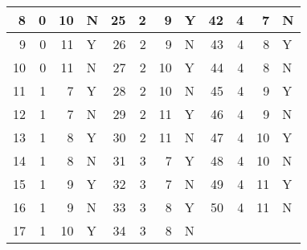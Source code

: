 \documentclass[12pt, letterpaper, titlepage]{article}
\begin{document}
\begin{table}[H]
\begin{tabular}{|r|r|r|l|r|r|r|l|r|r|r|l|}
    8                             & 0                      & 10                     & N & 25                           & 2                      & 9                      & Y & 42                           & 4                      & 7                      & N \\ \hline
    9                             & 0                      & 11                     & Y & 26                           & 2                      & 9                      & N & 43                           & 4                      & 8                      & Y \\ \hline
    10                            & 0                      & 11                     & N & 27                           & 2                      & 10                     & Y & 44                           & 4                      & 8                      & N \\ \hline
    11                            & 1                      & 7                      & Y & 28                           & 2                      & 10                     & N & 45                           & 4                      & 9                      & Y \\ \hline
    12                            & 1                      & 7                      & N & 29                           & 2                      & 11                     & Y & 46                           & 4                      & 9                      & N \\ \hline
    13                            & 1                      & 8                      & Y & 30                           & 2                      & 11                     & N & 47                           & 4                      & 10                     & Y \\ \hline
    14                            & 1                      & 8                      & N & 31                           & 3                      & 7                      & Y & 48                           & 4                      & 10                     & N \\ \hline
    15                            & 1                      & 9                      & Y & 32                           & 3                      & 7                      & N & 49                           & 4                      & 11                     & Y \\ \hline
    16                            & 1                      & 9                      & N & 33                           & 3                      & 8                      & Y & 50                           & 4                      & 11                     & N \\ \hline
    17                            & 1                      & 10                     & Y & 34                           & 3                      & 8                      & N & \multicolumn{1}{l|}{}        & \multicolumn{1}{l|}{}  & \multicolumn{1}{l|}{}  &   \\ \hline
    \end{tabular}
    \end{table}
\end{document}
